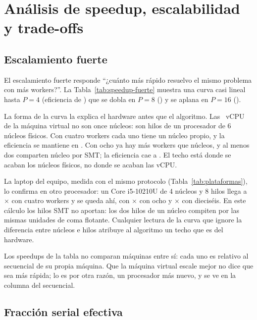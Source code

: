 \section{Análisis de speedup, escalabilidad y trade-offs}\label{sec:analisis}

\subsection{Escalamiento fuerte}

El escalamiento fuerte responde \enquote{¿cuánto más rápido resuelvo el mismo problema con más
workers?}. La Tabla~\ref{tab:speedup-fuerte} muestra una curva casi lineal hasta $P = 4$
(eficiencia de ) que se dobla en $P = 8$ () y se aplana
en $P = 16$ ().

La forma de la curva la explica el hardware antes que el algoritmo. Las ~vCPU de
la máquina virtual no son once núcleos: son hilos de un procesador de 6 núcleos físicos. Con cuatro
workers cada uno tiene un núcleo propio, y la eficiencia se mantiene en . Con
ocho ya hay más workers que núcleos, y al menos dos comparten núcleo por SMT; la eficiencia cae a
. El techo está donde se acaban los núcleos físicos, no donde se acaban las
vCPU.

La laptop del equipo, medida con el mismo protocolo (Tabla~\ref{tab:plataformas}), lo confirma en
otro procesador: un Core i5-10210U de 4 núcleos y 8 hilos llega a $\times$
con cuatro workers y se queda ahí, con $\times$ con ocho y
$\times$ con dieciséis. En este cálculo los hilos SMT no aportan: los dos
hilos de un núcleo compiten por las mismas unidades de coma flotante. Cualquier lectura de la curva
que ignore la diferencia entre núcleos e hilos atribuye al algoritmo un techo que es del hardware.



Los speedups de la tabla no comparan máquinas entre sí: cada uno es relativo al secuencial de su
propia máquina. Que la máquina virtual escale mejor no dice que sea más rápida; lo es por otra razón,
un procesador más nuevo, y se ve en la columna del secuencial.

\subsection{Fracción serial efectiva}\label{sec:karp}

